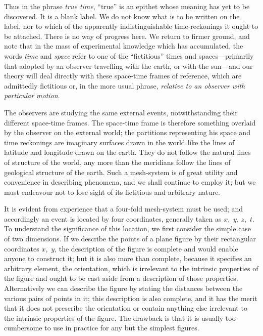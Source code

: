 \documentclass[12pt]{book}
\begin{document}
Thus in the phrase \emph{true time}, ``true'' is an epithet whose meaning has yet
to be discovered. It is a blank label. We do not know what is to be written
on the label, nor to which of the apparently indistinguishable time-reckonings
it ought to be attached. There is no way of progress here. We return to
firmer ground, and note that in the mass of experimental knowledge which
has accumulated, the words \emph{time} and \emph{space} refer to one of the ``fictitious''
times and spaces---primarily that adopted by an observer travelling with the
earth, or with the sun---and our theory will deal directly with these space-time
frames of reference, which are admittedly fictitious or, in the more usual
phrase, \emph{relative to an observer with particular motion}.

The observers are studying the same external events, notwithstanding
their different space-time frames. The space-time frame is therefore something
overlaid by the observer on the external world; the partitions representing
his space and time reckonings are imaginary surfaces drawn in the
world like the lines of latitude and longitude drawn on the earth. They do
not follow the natural lines of structure of the world, any more than the
meridians follow the lines of geological structure of the earth. Such a mesh-system
%
is of great utility and convenience in describing phenomena, and we
shall continue to employ it; but we must endeavour not to lose sight of its
fictitious and arbitrary nature.

It is evident from experience that a four-fold mesh-system must be used;
and accordingly an event is located by four coordinates, generally taken as
%
$x$,~$y$, $z$,~$t$. To understand the significance of this location, we first consider
the simple case of two dimensions. If we describe the points of a plane figure
by their rectangular coordinates $x$,~$y$, the description of the figure is complete
and would enable anyone to construct it; but it is also more than complete,
because it specifies an arbitrary element, the orientation, which is irrelevant
to the intrinsic properties of the figure and ought to be cast aside from
a description of those properties. Alternatively we can describe the figure by
stating the distances between the various pairs of points in it; this description
is also complete, and it has the merit that it does not prescribe the
orientation or contain anything else irrelevant to the intrinsic properties of
the figure. The drawback is that it is usually too cumbersome to use in
practice for any but the simplest figures.
\end{document}

